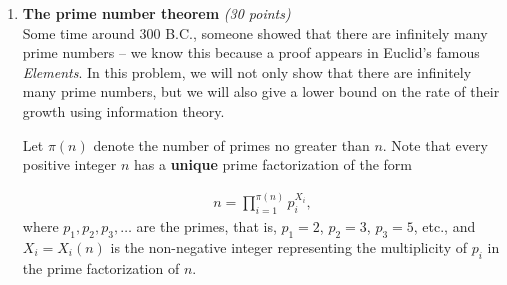 \documentclass[12pt]{article}
\begin{document}
\begin{enumerate}
\begin{solution}{\bf Solution: Non-prefix Code}
\begin{enumerate}[(a)]
\item 
\begin{align*}
\fE[l(X)] =&\sum_{i=1}^K p(i) \lfloor \log i \rfloor\\
\geq & \sum_{i=1}^K p(i) (\log i -1)\\
= & \sum_{i=1}^K p(i) (-\log p(i) + \log ip(i) -1)\\
= & H(X)-1-\sum_{i=1}^K p(i) \log \frac{1}{ip(i)}\\
\geq & H(X)-1- \log \left(\sum_{i=1}^K p(i)\frac{1}{ip(i)}\right)\\
\geq & H(X)-1- \log \left(\sum_{i=1}^K \frac{1}{i}\right)\\
\geq & H(X)-1- \log (1+\log K)
\end{align*}
\end{enumerate}
\end{solution}

\begin{problem}
\end{problem}
\begin{problem}
\newpage
\end{problem}



\item  {\bf The prime number theorem} {\it (30 points)}\\

Some time around 300 B.C., someone showed that there are infinitely many prime numbers -- we know this because a proof appears in Euclid's famous {\em Elements}. In this problem, we will not only show that there are infinitely many prime numbers, but we will also give a lower bound on the rate of their growth using information theory. 


Let $\pi(n)$ denote the number of primes no greater than $n$. Note that every positive   integer $n$ has a \textbf{unique} prime factorization of the form

\begin{align*}
n = \prod_{i=1}^{\pi(n)} p_{i}^{X_i},
\end{align*}
where $p_1, p_2, p_3, \ldots$ are the primes, that is, $p_1 = 2$, $p_2 = 3$, $p_3 = 5$, etc., and $X_i = X_i(n)$ is the non-negative integer representing the multiplicity of $p_i$ in the prime factorization of $n$. 


\end{enumerate}
\end{document}
